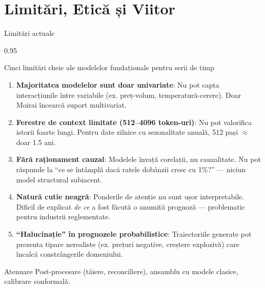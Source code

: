 \documentclass[9pt, aspectratio=169, t]{beamer}
\begin{document}
\section{Limitări, Etică și Viitor}

\begin{frame}{Limitări actuale}
    \begin{cminipage}{0.95\textwidth}
    \vspace{-2mm}
    \begin{alertblock}{Cinci limitări cheie ale modelelor fundaționale pentru serii de timp}
        {\small
        \begin{enumerate}\setlength{\itemsep}{2pt}
            \item \textbf{Majoritatea modelelor sunt doar univariate}: Nu pot capta interacțiunile între variabile (ex. preț-volum, temperatură-cerere). Doar Moirai încearcă suport multivariat.
            \item \textbf{Ferestre de context limitate (512--4096 token-uri)}: Nu pot valorifica istorii foarte lungi. Pentru date zilnice cu sezonalitate anuală, 512 pași $\approx$ doar 1.5 ani.
            \item \textbf{Fără raționament cauzal}: Modelele învață corelații, nu cauzalitate. Nu pot răspunde la ``ce se întâmplă dacă ratele dobânzii cresc cu 1\%?'' --- niciun model structural subiacent.
            \item \textbf{Natură cutie neagră}: Ponderile de atenție nu sunt ușor interpretabile. Dificil de explicat \textit{de ce} a fost făcută o anumită prognoză --- problematic pentru industrii reglementate.
            \item \textbf{``Halucinație'' în prognozele probabilistice}: Traiectoriile generate pot prezenta tipare nerealiste (ex. prețuri negative, creștere explozivă) care încalcă constrângerile domeniului.
        \end{enumerate}
        }
    \end{alertblock}
    \vspace{-2mm}
    \begin{exampleblock}{Atenuare}
        {\small Post-procesare (tăiere, reconciliere), ansamblu cu modele clasice, calibrare conformală.}
    \end{exampleblock}
    \end{cminipage}
\end{frame}
\end{document}
